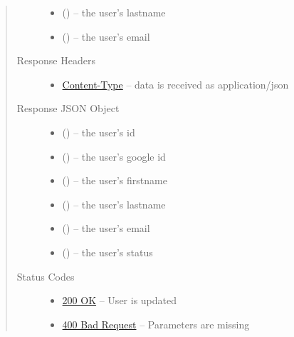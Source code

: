 \documentclass[letterpaper,10pt,english]{sphinxmanual}
\begin{document}
\begin{fulllineitems}
\begin{quote}
\begin{description}
\begin{itemize}
\item {} 
 () -- the user's lastname

\item {} 
 () -- the user's email

\end{itemize}

\item[{Response Headers}] \leavevmode\begin{itemize}
\item {} 
\href{http://tools.ietf.org/html/rfc7231\#section-3.1.1.5}{Content-Type} -- data is received as application/json

\end{itemize}

\item[{Response JSON Object}] \leavevmode\begin{itemize}
\item {} 
 () -- the user's id

\item {} 
 () -- the user's google id

\item {} 
 () -- the user's firstname

\item {} 
 () -- the user's lastname

\item {} 
 () -- the user's email

\item {} 
 () -- the user's status

\end{itemize}

\item[{Status Codes}] \leavevmode\begin{itemize}
\item {} 
\href{http://www.w3.org/Protocols/rfc2616/rfc2616-sec10.html\#sec10.2.1}{200 OK} -- User is updated

\item {} 
\href{http://www.w3.org/Protocols/rfc2616/rfc2616-sec10.html\#sec10.4.1}{400 Bad Request} -- Parameters are missing


\end{itemize}
\end{description}
\end{quote}
\end{fulllineitems}
\end{document}
